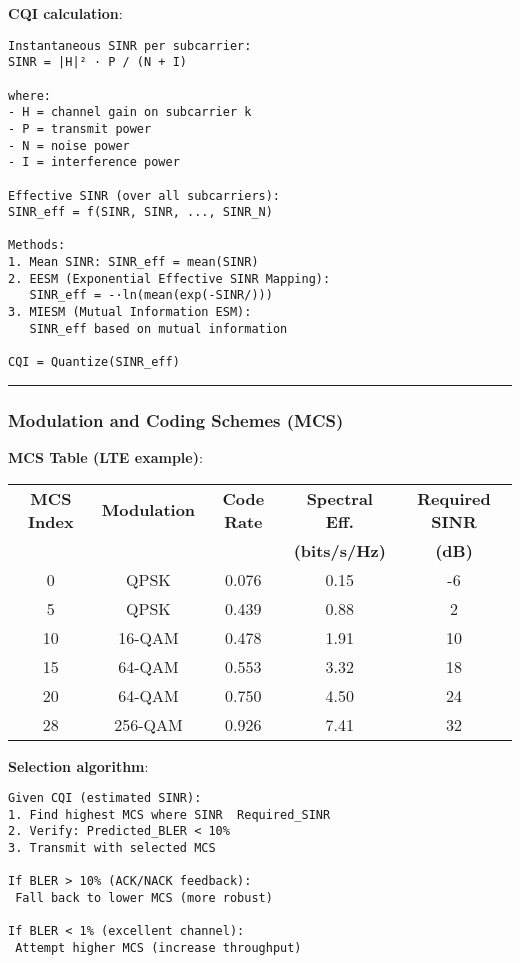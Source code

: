 \textbf{CQI calculation}:

\begin{verbatim}
Instantaneous SINR per subcarrier:
SINR = |H|² · P / (N + I)

where:
- H = channel gain on subcarrier k
- P = transmit power
- N = noise power
- I = interference power

Effective SINR (over all subcarriers):
SINR_eff = f(SINR, SINR, ..., SINR_N)

Methods:
1. Mean SINR: SINR_eff = mean(SINR)
2. EESM (Exponential Effective SINR Mapping):
   SINR_eff = -·ln(mean(exp(-SINR/)))
3. MIESM (Mutual Information ESM):
   SINR_eff based on mutual information

CQI = Quantize(SINR_eff)
\end{verbatim}

\begin{center}\rule{0.5\linewidth}{0.5pt}\end{center}

\subsubsection{Modulation and Coding Schemes (MCS)}\label{modulation-and-coding-schemes-mcs}

\textbf{MCS Table (LTE example)}:

\begin{center}
\begin{tabular}{@{}ccccc@{}}
\toprule
\textbf{MCS Index} & \textbf{Modulation} & \textbf{Code Rate} & \textbf{Spectral Eff.} & \textbf{Required SINR} \\
 & & & \textbf{(bits/s/Hz)} & \textbf{(dB)} \\
\midrule
0 & QPSK & 0.076 & 0.15 & -6 \\
5 & QPSK & 0.439 & 0.88 & 2 \\
10 & 16-QAM & 0.478 & 1.91 & 10 \\
15 & 64-QAM & 0.553 & 3.32 & 18 \\
20 & 64-QAM & 0.750 & 4.50 & 24 \\
28 & 256-QAM & 0.926 & 7.41 & 32 \\
\bottomrule
\end{tabular}
\end{center}

\textbf{Selection algorithm}:

\begin{verbatim}
Given CQI (estimated SINR):
1. Find highest MCS where SINR  Required_SINR
2. Verify: Predicted_BLER < 10%
3. Transmit with selected MCS

If BLER > 10% (ACK/NACK feedback):
 Fall back to lower MCS (more robust)

If BLER < 1% (excellent channel):
 Attempt higher MCS (increase throughput)
\end{verbatim}


